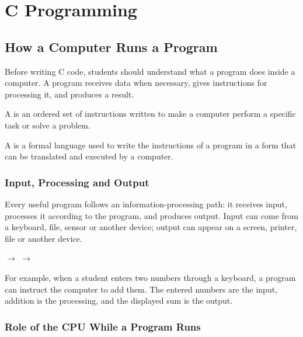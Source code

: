 
\chapter{C Programming}

\section{How a Computer Runs a Program}

Before writing C code, students should understand what a program does inside a computer. A program receives data when necessary, gives instructions for processing it, and produces a result.

\begin{definitionbox}[Program]
    A  is an ordered set of instructions written to make a computer perform a specific task or solve a problem.
\end{definitionbox}

\begin{definitionbox}
    A  is a formal language used to write the instructions of a program in a form that can be translated and executed by a computer.
\end{definitionbox}

\subsection{Input, Processing and Output}

Every useful program follows an information-processing path: it receives input, processes it according to the program, and produces output. Input can come from a keyboard, file, sensor or another device; output can appear on a screen, printer, file or another device.

\begin{formulabox}
    \centering
     \(\longrightarrow\)  \(\longrightarrow\) 
\end{formulabox}

For example, when a student enters two numbers through a keyboard, a program can instruct the computer to add them. The entered numbers are the input, addition is the processing, and the displayed sum is the output.

\subsection{Role of the CPU While a Program Runs}

